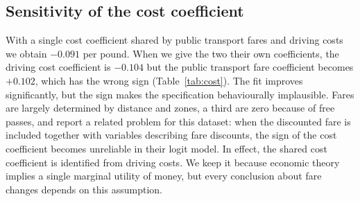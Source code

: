 \documentclass[11pt,a4paper]{article}
\newcommand{\tabpath}{tables/}
\begin{document}
\begin{table}[H]
\centering\small

\caption{Nested Logit structures compared with the Multinomial Logit, estimated on the training years. Nest parameters are shown for the nests that are not singletons.}
\label{tab:nested}
\end{table}

\subsection{Sensitivity of the cost coefficient}
\label{sec:cost}
With a single cost coefficient shared by public transport fares and driving costs we obtain $-0.091$ per pound. When we give the two their own coefficients, the driving cost coefficient is $-0.104$ but the public transport fare coefficient becomes $+0.102$, which has the wrong sign (Table~\ref{tab:cost}). The fit improves significantly, but the sign makes the specification behaviourally implausible. Fares are largely determined by distance and zones, a third are zero because of free passes, and \citet{martinbaos2023} report a related problem for this dataset: when the discounted fare is included together with variables describing fare discounts, the sign of the cost coefficient becomes unreliable in their logit model. In effect, the shared cost coefficient is identified from driving costs. We keep it because economic theory implies a single marginal utility of money, but every conclusion about fare changes depends on this assumption.

\begin{table}[H]
\centering\small

\caption{Cost coefficients with shared and separate public transport and car coefficients (selected specification, training years).}
\label{tab:cost}
\end{table}
\end{document}
